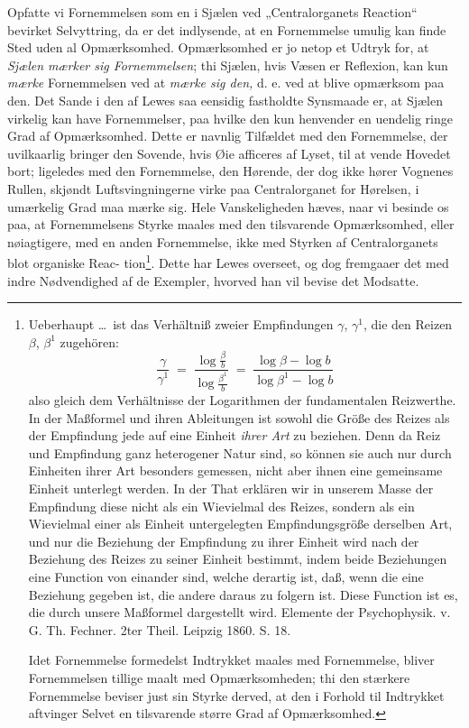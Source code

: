 \documentclass[12pt,a4paper]{book}
\begin{document}
Opfatte vi Fornemmelsen som en i Sjælen ved „Centralorganets Reaction“ bevirket
Selvyttring, da er det indlysende, at en Fornemmelse umulig kan finde Sted uden
al Opmærksomhed. Opmærksomhed er jo netop et Udtryk for, at \emph{Sjælen mærker
sig Fornemmelsen}; thi Sjælen, hvis Væsen er Reflexion, kan kun \emph{mærke}
Fornemmelsen ved at \emph{mærke sig den,} d. e. ved at blive opmærksom paa den.
Det Sande i den af Lewes saa eensidig fastholdte Synsmaade er, at Sjælen
virkelig kan have Fornemmelser, paa hvilke den kun henvender en uendelig ringe
Grad af Opmærksomhed. Dette er navnlig Tilfældet med den Fornemmelse, der
uvilkaarlig bringer den Sovende, hvis Øie afficeres af Lyset, til at vende
Hovedet bort; ligeledes med den Fornemmelse, den Hørende, der dog ikke hører
Vognenes Rullen, skjøndt Luftsvingningerne virke paa Centralorganet for
Hørelsen, i umærkelig Grad maa mærke sig. Hele Vanskeligheden hæves, naar vi
besinde os paa, at Fornemmelsens Styrke maales med den tilsvarende
Opmærksomhed, eller nøiagtigere, med en anden Fornemmelse, ikke med Styrken af
Centralorganets blot organiske Reac-
\setcounter{footnote}{0}
tion\footnote{Ueberhaupt \dots\ ist das Verhältniß zweier Empfindungen $\gamma$,
$\gamma^{1}$, die den Reizen $\beta$, $\beta^{1}$ zugehören:
\[ \frac{\gamma}{\gamma^{1}} \;=\; \frac{\log \frac{\beta}{b}}{\log \frac{\beta^{1}}{b}}
   \;=\; \frac{\log\beta - \log b}{\log\beta^{1} - \log b} \]
also gleich dem Verhältnisse der Logarithmen der fundamentalen Reizwerthe. In
der Maßformel und ihren Ableitungen ist sowohl die Größe des Reizes als der
Empfindung jede auf eine Einheit \emph{ihrer Art} zu beziehen. Denn da Reiz und
Empfindung ganz heterogener Natur sind, so können sie auch nur durch Einheiten
ihrer Art besonders gemessen, nicht aber ihnen eine gemeinsame Einheit unterlegt
werden. In der That erklären wir in unserem Masse der Empfindung diese nicht als
ein Wievielmal des Reizes, sondern als ein Wievielmal einer als Einheit
untergelegten Empfindungsgröße derselben Art, und nur die Beziehung der
Empfindung zu ihrer Einheit wird nach der Beziehung des Reizes zu seiner Einheit
bestimmt, indem beide Beziehungen eine Function von einander sind, welche
derartig ist, daß, wenn die eine Beziehung gegeben ist, die andere daraus zu
folgern ist. Diese Function ist es, die durch unsere Maßformel dargestellt wird.
Elemente der Psychophysik. v. G. Th. Fechner. 2ter Theil. Leipzig 1860. S. 18.
\par Idet Fornemmelse formedelst Indtrykket maales med Fornemmelse, bliver
Fornemmelsen tillige maalt med Opmærksomheden; thi den stærkere Fornemmelse
beviser just sin Styrke derved, at den i Forhold til Indtrykket aftvinger Selvet
en tilsvarende større Grad af Opmærksomhed.}. Dette har Lewes overseet, og dog
fremgaaer det med indre Nødvendighed af de Exempler, hvorved han vil bevise det
Modsatte.
\end{document}
